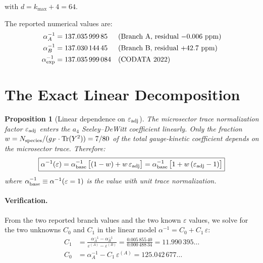 \documentclass[12pt,a4paper]{article}
\newtheorem{proposition}{Proposition}
\begin{document}
\noindent with $d = k_{\max} + 4 = 64$.

The reported numerical values are:
\begin{align}
\alpha^{-1}_A &= 137.035\,999\,85 && \text{(Branch A, residual $-0.006$~ppm)} \\
\alpha^{-1}_B &= 137.030\,144\,45 && \text{(Branch B, residual $+42.7$~ppm)} \\
\alpha^{-1}_{\rm exp} &= 137.035\,999\,084 && \text{(CODATA 2022)}
\end{align}

\section{The Exact Linear Decomposition}
\label{sec:linear}

\begin{proposition}[Linear dependence on $\varepsilon_{\rm adj}$]
The microsector trace normalization factor $\varepsilon_{\rm adj}$ enters
the $a_4$ Seeley--DeWitt coefficient linearly. Only the fraction
$w = N_{\rm species}/(g_F \cdot \mathrm{Tr}(Y^2)) = 7/80$ of the total
gauge-kinetic coefficient depends on the microsector trace.
Therefore:
\begin{equation}\label{eq:linear}
\boxed{
\alpha^{-1}(\varepsilon) = \alpha^{-1}_{\rm base}\,
\bigl[(1 - w) + w\,\varepsilon_{\rm adj}\bigr]
= \alpha^{-1}_{\rm base}\,
\bigl[1 + w\,(\varepsilon_{\rm adj} - 1)\bigr]
}
\end{equation}
where $\alpha^{-1}_{\rm base} \equiv \alpha^{-1}(\varepsilon = 1)$ is the
value with unit trace normalization.
\end{proposition}

\paragraph{Verification.}
From the two reported branch values and the two known $\varepsilon$ values,
we solve for the two unknowns $C_0$ and $C_1$ in the linear model
$\alpha^{-1} = C_0 + C_1\,\varepsilon$:
\begin{align}
C_1 &= \frac{\alpha^{-1}_A - \alpha^{-1}_B}
            {\varepsilon^{(A)} - \varepsilon^{(B)}}
     = \frac{0.005\,855\,40}{0.000\,488\,34}
     = 11.990\,395\ldots \\
C_0 &= \alpha^{-1}_A - C_1\,\varepsilon^{(A)}
     = 125.042\,677\ldots
\end{align}
\end{document}
